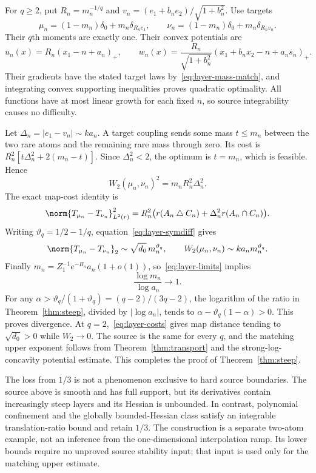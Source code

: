 For $q\ge2$, put $R_n=m_n^{-1/q}$ and
$v_n=(e_1+b_ne_2)/\sqrt{1+b_n^2}$. Use targets
\[
 \mu_n=(1-m_n)\delta_0+m_n\delta_{R_ne_1},\qquad
 \nu_n=(1-m_n)\delta_0+m_n\delta_{R_nv_n}.
\]
Their $q$th moments are exactly one. Their convex potentials are
\[
 u_n(x)=R_n(x_1-n+a_n)_+,\qquad
 w_n(x)=\frac{R_n}{\sqrt{1+b_n^2}}
             (x_1+b_nx_2-n+a_ns_n)_+.
\]
Their gradients have the stated target laws by~\eqref{eq:layer-mass-match}, and integrating convex supporting inequalities proves quadratic optimality. All functions have at most linear growth for each fixed $n$, so source integrability causes no difficulty.

Let $\Delta_n=|e_1-v_n|\sim ka_n$. A target coupling sends some mass $t\le m_n$ between the two rare atoms and the remaining rare mass through zero. Its cost is
$R_n^2[t\Delta_n^2+2(m_n-t)]$. Since $\Delta_n^2<2$, the optimum is $t=m_n$, which is feasible. Hence
\[
 W_2(\mu_n,\nu_n)^2=m_nR_n^2\Delta_n^2.
\]
The exact map-cost identity is
\[
 \norm{T_{\mu_n}-T_{\nu_n}}_{L^2(r)}^2
 =R_n^2\bigl(r(A_n\mathbin\triangle C_n)
                  +\Delta_n^2r(A_n\cap C_n)\bigr).
\]
Writing $\vartheta_q=1/2-1/q$, equation~\eqref{eq:layer-symdiff} gives
\begin{equation}\label{eq:layer-costs}
 \norm{T_{\mu_n}-T_{\nu_n}}_2\sim\sqrt{d_0}\,m_n^{\vartheta_q},
 \qquad W_2(\mu_n,\nu_n)\sim k a_nm_n^{\vartheta_q}.
\end{equation}
Finally $m_n=Z_1^{-1}e^{-B_n}a_n(1+o(1))$, so~\eqref{eq:layer-limits} implies
\[
 \frac{\log m_n}{\log a_n}\longrightarrow1.
\]
For any $\alpha>\vartheta_q/(1+\vartheta_q)=(q-2)/(3q-2)$, the logarithm of the ratio in Theorem~\ref{thm:steep}, divided by $|\log a_n|$, tends to
$\alpha-\vartheta_q(1-\alpha)>0$. This proves divergence. At $q=2$,~\eqref{eq:layer-costs} gives map distance tending to $\sqrt{d_0}>0$ while $W_2\to0$. The source is the same for every $q$, and the matching upper exponent follows from Theorem~\ref{thm:transport} and the strong-log-concavity potential estimate. This completes the proof of Theorem~\ref{thm:steep}.

\begin{remark}
The loss from $1/3$ is not a phenomenon exclusive to hard source boundaries. The source above is smooth and has full support, but its derivatives contain increasingly steep layers and its Hessian is unbounded. In contrast, polynomial confinement and the globally bounded-Hessian class satisfy an integrable translation-ratio bound and retain $1/3$. The construction is a separate two-atom example, not an inference from the one-dimensional interpolation ramp. Its lower bounds require no unproved source stability input; that input is used only for the matching upper estimate.
\end{remark}
